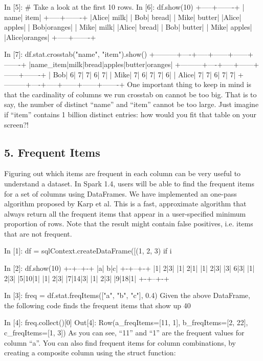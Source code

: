 In [5]: # Take a look at the first 10 rows.
In [6]: df.show(10)
+-----+-------+
| name|   item|
+-----+-------+
|Alice|   milk|
|  Bob|  bread|
| Mike| butter|
|Alice| apples|
|  Bob|oranges|
| Mike|   milk|
|Alice|  bread|
|  Bob| butter|
| Mike| apples|
|Alice|oranges|
+-----+-------+

In [7]: df.stat.crosstab("name", "item").show()
+---------+----+-----+------+------+-------+
|name_item|milk|bread|apples|butter|oranges|
+---------+----+-----+------+------+-------+
|      Bob|   6|    7|     7|     6|      7|
|     Mike|   7|    6|     7|     7|      6|
|    Alice|   7|    7|     6|     7|      7|
+---------+----+-----+------+------+-------+
One important thing to keep in mind is that the cardinality of columns we run crosstab on cannot be too big. That is to say, the number of distinct “name” and “item” cannot be too large. Just imagine if “item” contains 1 billion distinct entries: how would you fit that table on your screen?!

\subsection*{5. Frequent Items}
Figuring out which items are frequent in each column can be very useful to understand a dataset. In Spark 1.4, users will be able to find the frequent items for a set of columns using DataFrames. We have implemented an one-pass algorithm proposed by Karp et al. This is a fast, approximate algorithm that always return all the frequent items that appear in a user-specified minimum proportion of rows. Note that the result might contain false positives, i.e. items that are not frequent.

In [1]: df = sqlContext.createDataFrame([(1, 2, 3) if i %

In [2]: df.show(10)
+-+--+-+
|a| b|c|
+-+--+-+
|1| 2|3|
|1| 2|1|
|1| 2|3|
|3| 6|3|
|1| 2|3|
|5|10|1|
|1| 2|3|
|7|14|3|
|1| 2|3|
|9|18|1|
+-+--+-+

In [3]: freq = df.stat.freqItems(["a", "b", "c"], 0.4)
Given the above DataFrame, the following code finds the frequent items that show up 40%

In [4]: freq.collect()[0]
Out[4]: Row(a_freqItems=[11, 1], b_freqItems=[2, 22], c_freqItems=[1, 3])
As you can see, “11” and “1” are the frequent values for column “a”. You can also find frequent items for column combinations, by creating a composite column using the struct function:


